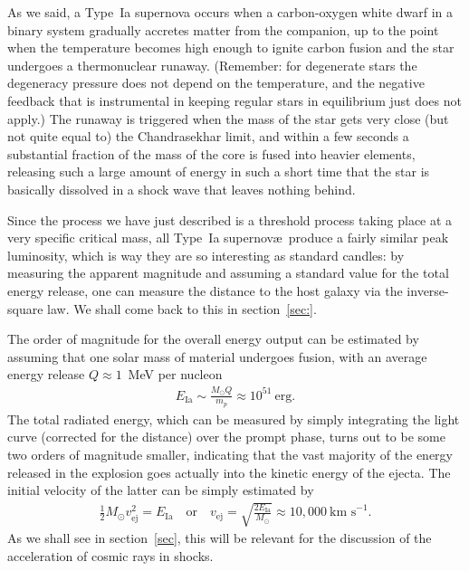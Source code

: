 As we said, a Type~Ia supernova occurs when a carbon-oxygen white dwarf in a binary system
gradually accretes matter from the companion, up to the point when the temperature
becomes high enough to ignite carbon fusion and the star undergoes a thermonuclear
runaway. (Remember: for degenerate stars the degeneracy pressure does not depend
on the temperature, and the negative feedback that is instrumental in keeping regular
stars in equilibrium just does not apply.) The runaway is triggered when the mass
of the star gets very close (but not quite equal to) the Chandrasekhar limit, and
within a few seconds a substantial fraction of the mass of the core is fused into
heavier elements, releasing such a large amount of energy in such a short time that
the star is basically dissolved in a shock wave that leaves nothing behind.

Since the process we have just described is a threshold process taking place at a very
specific critical mass, all Type~Ia supernov\ae\ produce a fairly similar peak luminosity,
which is way they are so interesting as standard candles: by measuring the apparent
magnitude and assuming a standard value for the total energy release,
one can measure the distance to the host galaxy via the inverse-square law.
We shall come back to this in section~\ref{sec:}.

The order of magnitude for the overall energy output can be estimated by assuming
that one solar mass of material undergoes fusion, with an average energy release
$Q \approx 1$~MeV per nucleon
\begin{align}
	E_\text{Ia} \sim \frac{M_\odot Q}{m_p} \approx 10^{51}~\text{erg}.
\end{align}
The total radiated energy, which can be measured by simply integrating the light curve
(corrected for the distance) over the prompt phase, turns out to be some two orders
of magnitude smaller, indicating that the vast majority of the energy released in the
explosion goes actually into the kinetic energy of the ejecta. The initial velocity of the latter
can be simply estimated by
\begin{align}
  \frac{1}{2} M_\odot v_\text{ej}^2 = E_\text{Ia}
  \quad\text{or}\quad
  v_\text{ej} = \sqrt{\frac{2 E_\text{Ia}}{M_\odot}} \approx 10,000~\text{km~s}^{-1}.
\end{align}
As we shall see in section~\ref{sec}, this will be relevant for the discussion of
the acceleration of cosmic rays in shocks.


